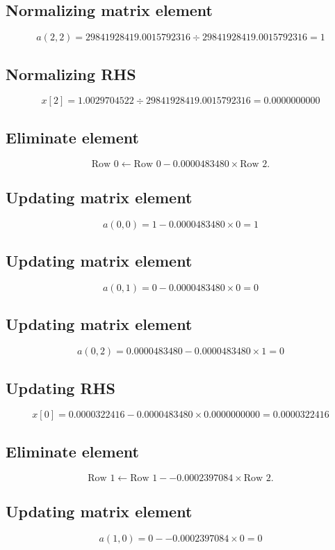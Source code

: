 \documentclass{article}
\begin{document}
\subsection*{ \vspace{1em} Normalizing matrix element}
\[
a( 2,2 ) = 29841928419.0015792316 \div 29841928419.0015792316 = 1
\]
\subsection*{ \vspace{1em} Normalizing RHS}
\[
x[2] = 1.0029704522 \div 29841928419.0015792316 = 0.0000000000
\]
\subsection*{ \vspace{1em} Eliminate element}
\[
\text{Row } 0 \leftarrow \text{Row }0 - 0.0000483480 \times \text{Row } 2.
\]
\subsection*{ \vspace{1em} Updating matrix element}
\[
a(0,0 ) = 1 - 0.0000483480 \times 0 = 1
\]
\subsection*{ \vspace{1em} Updating matrix element}
\[
a(0,1 ) = 0 - 0.0000483480 \times 0 = 0
\]
\subsection*{ \vspace{1em} Updating matrix element}
\[
a(0,2 ) = 0.0000483480 - 0.0000483480 \times 1 = 0
\]
\subsection*{ \vspace{1em} Updating RHS}
\[
x[0] = 0.0000322416 - 0.0000483480 \times 0.0000000000 = 0.0000322416
\]
\subsection*{ \vspace{1em} Eliminate element}
\[
\text{Row } 1 \leftarrow \text{Row }1 - -0.0002397084 \times \text{Row } 2.
\]
\subsection*{ \vspace{1em} Updating matrix element}
\[
a(1,0 ) = 0 - -0.0002397084 \times 0 = 0
\]
\end{document}
